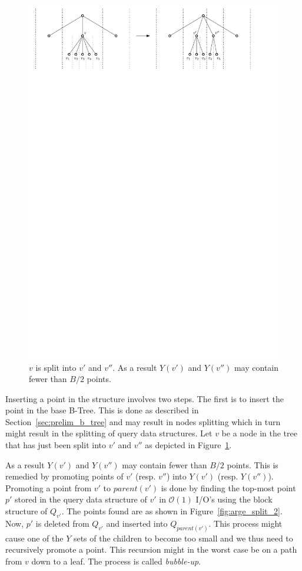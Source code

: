 \documentclass[twoside,11pt,openright]{report}
\begin{document}
\begin{figure}[b]
	\centering
     \includegraphics[width=\textwidth]{../figures/arge_split}
     \caption{$v$ is split into $v'$ and $v''$. As a result $Y(v')$ and $Y(v'')$ may contain fewer than $B/2$ points.}
     \label{fig:arge_split_1}
\end{figure}

Inserting a point in the structure involves two steps. The first is to insert the point in the base B-Tree. This is done as described in Section~\ref{sec:prelim_b_tree} and may result in nodes splitting which in turn might result in the splitting of query data structures. Let $v$ be a node in the tree that has just been split into $v'$ and $v''$ as depicted in Figure~\ref{fig:arge_split_1}.

As a result $Y(v')$ and $Y(v'')$ may contain fewer than $B/2$ points. This is remedied by promoting points of $v'$ (resp. $v''$) into $Y(v')$ (resp. $Y(v'')$). Promoting a point from $v'$ to $parent(v')$ is done by finding the top-most point $p'$ stored in the query data structure of $v'$ in $\mathcal{O}(1)$ I/O's using the block structure of $Q_{v'}$. The points found are as shown in Figure~\ref{fig:arge_split_2}. Now, $p'$ is deleted from $Q_{v'}$ and inserted into $Q_{parent(v')}$. This process might cause one of the $Y$ sets of the children to become too small and we thus need to recursively promote a point. This recursion might in the worst case be on a path from $v$ down to a leaf. The process is called \textit{bubble-up}.
\end{document}
